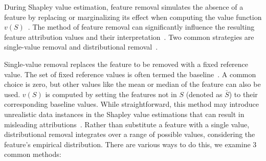 During Shapley value estimation, feature removal simulates the absence of a feature by replacing or marginalizing its effect when computing the value function \( v(S) \)~\cite{chen2023algorithms}. The method of feature removal can significantly influence the resulting feature attribution values and their interpretation~\cite{sundararajan2020many, kumar2020problems, merrick2019games}. Two common strategies are single-value removal and distributional removal~\cite{chen2023algorithms}.

Single-value removal replaces the feature to be removed with a fixed reference value. The set of fixed reference values is often termed the baseline~\cite{sundararajan2020many}. A common choice is zero, but other values like the mean or median of the feature can also be used. \( v(S) \) is computed by setting the features not in \( S \) (denoted as \(\bar{S}\)) to their corresponding baseline values. While straightforward, this method may introduce unrealistic data instances in the Shapley value estimations that can result in misleading attributions~\cite{aas2021, Zhao_OOdistribution}. Rather than substitute a feature with a single value, distributional removal integrates over a range of possible values, considering the feature's empirical distribution. There are various ways to do this, we examine 3 common methods:



